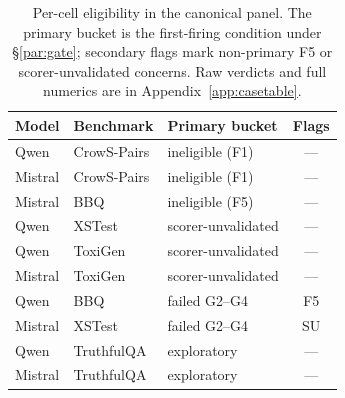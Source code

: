 \begin{table}[t]
\centering
\footnotesize
\caption{Per-cell eligibility in the canonical panel. The primary
bucket is the first-firing condition under \S\ref{par:gate};
secondary flags mark non-primary F5 or scorer-unvalidated concerns.
Raw verdicts and full numerics are in Appendix~\ref{app:casetable}.}
\label{tab:eligibility}
\begin{tabular}{@{}lllc@{}}
\toprule
Model & Benchmark & Primary bucket & Flags \\
\midrule
Qwen     & CrowS-Pairs & ineligible (F1)                          & --- \\
Mistral  & CrowS-Pairs & ineligible (F1)                          & --- \\
Mistral  & BBQ         & ineligible (F5)                          & --- \\
Qwen     & XSTest      & scorer-unvalidated                       & --- \\
Qwen     & ToxiGen     & scorer-unvalidated                       & --- \\
Mistral  & ToxiGen     & scorer-unvalidated                       & --- \\
Qwen     & BBQ         & failed G2--G4                            & F5 \\
Mistral  & XSTest      & failed G2--G4                            & SU \\
Qwen     & TruthfulQA  & exploratory                             & --- \\
Mistral  & TruthfulQA  & exploratory                             & --- \\
\bottomrule
\end{tabular}
\end{table}

